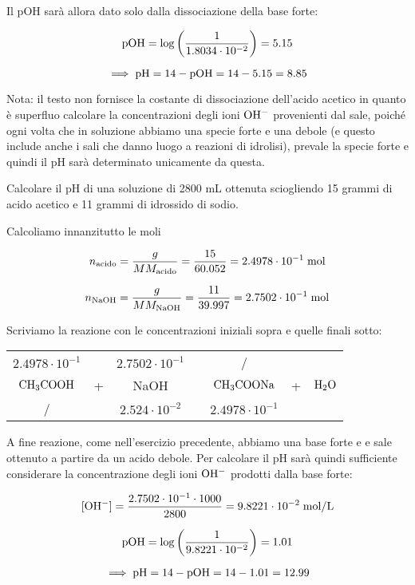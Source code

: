 \begin{soluzione}
Il pOH sarà allora dato solo dalla dissociazione della base forte:

$$\rm pOH=\log{\left(\frac{1}{1.8034 \cdot 10^{-2}}\right)}=5.15$$

$$\implies \rm pH=14-pOH=14-5.15=8.85$$

Nota: il testo non fornisce la costante di dissociazione dell'acido acetico in quanto è superfluo calcolare la concentrazioni degli ioni $\rm OH^-$ provenienti dal sale, poiché ogni volta che in soluzione abbiamo una specie forte e una debole (e questo include anche i sali che danno luogo a reazioni di idrolisi), prevale la specie forte e quindi il pH sarà determinato unicamente da questa.
\end{soluzione}

\newpage

\begin{esercizio}
    Calcolare il pH di una soluzione di 2800 mL ottenuta sciogliendo 15 grammi di acido acetico e 11 grammi di idrossido di sodio.
\end{esercizio}
\begin{soluzione}
    Calcoliamo innanzitutto le moli

$$n_{\text{acido}}=\frac{g}{MM_{\text{acido}}}=\frac{15}{60.052}=2.4978 \cdot 10^{-1} \; \rm mol$$

$$n_{\text{NaOH}}=\frac{g}{MM_{\text{NaOH}}}=\frac{11}{39.997}=2.7502 \cdot 10^{-1} \; \rm mol$$

Scriviamo la reazione con le concentrazioni iniziali sopra e quelle finali sotto:

\begin{center}
    \begin{tabular}{ccccccc}
        $2.4978 \cdot 10^{-1}$ &  & $2.7502 \cdot 10^{-1}$ & & / &&\\
        $\rm CH_3COOH$ & + & NaOH & \ce{->} & $\rm CH_3COONa$ & + & $\rm H_2O$\\
        / &  &  $2.524 \cdot 10^{-2}$ & & $2.4978 \cdot 10^{-1}$&&\\
    \end{tabular}
\end{center}

A fine reazione, come nell'esercizio precedente, abbiamo una base forte e e sale ottenuto a partire da un acido debole. Per calcolare il pH sarà quindi sufficiente considerare la concentrazione degli ioni $\rm OH^-$ prodotti dalla base forte:

$$[\rm OH^-]=\frac{2.7502 \cdot 10^{-1} \cdot 1000}{2800}=9.8221 \cdot 10^{-2} \; \rm mol/L$$

$$\rm pOH=\log{\left(\frac{1}{9.8221 \cdot 10^{-2}}\right)}=1.01$$

$$\implies \rm pH=14-pOH=14-1.01=12.99$$
\end{soluzione}


